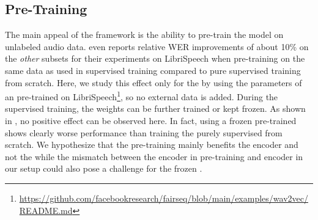 \documentclass{INTERSPEECH2023}
\begin{document}
%

%

\subsection{\wvtwo Pre-Training}
The main appeal of the \wvtwo framework is the ability to pre-train the model on unlabeled audio data.
\cite{facebook2020wav2vec2} even reports relative \gls{WER} improvements of about 10\% on the \textit{other} subsets for their experiments on LibriSpeech when pre-training on the same data as used in supervised training compared to pure supervised training from scratch.
Here, we study this effect only for the \fe by using the parameters of an \fe pre-trained on LibriSpeech\footnote{\raggedright\url{https://github.com/facebookresearch/fairseq/blob/main/examples/wav2vec/README.md}}, so no external data is added.
During the supervised training, the \fe weights can be further trained or kept frozen.
As shown in , no positive effect can be observed here.
In fact, using a frozen pre-trained \fe shows clearly worse performance than training the \fe purely supervised from scratch.
We hypothesize that the pre-training mainly benefits the \transformer encoder and not the \fe while the mismatch between the \transformer encoder in pre-training and \conformer encoder in our setup could also pose a challenge for the frozen \fe.

\end{document}
